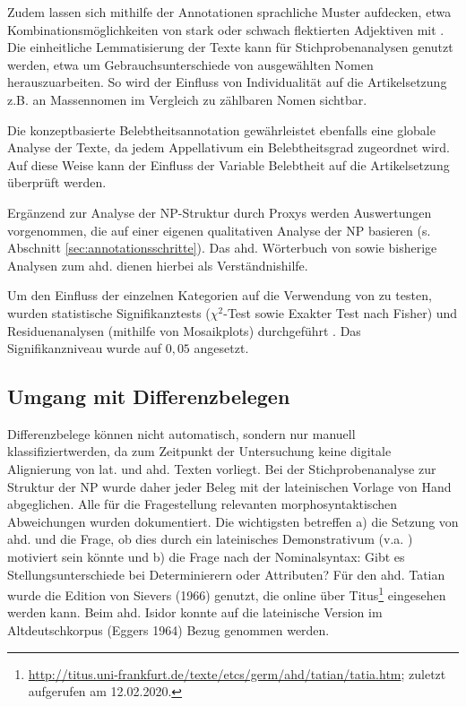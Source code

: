 Zudem lassen sich mithilfe der Annotationen sprachliche Muster aufdecken, etwa Kombinationsmöglichkeiten von stark oder schwach flektierten Adjektiven mit . Die einheitliche Lemmatisierung der Texte kann für Stichprobenanalysen genutzt werden, etwa um Gebrauchsunterschiede  von ausgewählten Nomen herauszuarbeiten. So wird der Einfluss von Individualität auf die Artikelsetzung z.B. an Massennomen im Vergleich zu zählbaren Nomen sichtbar.

Die konzeptbasierte Belebtheitsannotation gewährleistet ebenfalls eine globale Analyse der Texte, da jedem Appellativum ein Belebtheitsgrad zugeordnet wird. Auf diese Weise kann der Einfluss der Variable Belebtheit auf die Artikelsetzung überprüft werden. 

Ergänzend zur Analyse der NP-Struktur durch Proxys werden Auswertungen vorgenommen, die auf einer eigenen qualitativen Analyse der NP basieren (s. Abschnitt \ref{sec:annotationsschritte}). Das ahd. Wörterbuch von \textcite{Schutzeichel2012} sowie bisherige Analysen zum ahd.  \parencite[v.a.][]{Oubouzar1989} dienen hierbei als Verständnishilfe.  

Um den Einfluss der einzelnen Kategorien auf die Verwendung von  zu testen, wurden statistische Signifikanztests ($\chi^2$-Test sowie Exakter Test nach Fisher) und Residuenanalysen (mithilfe von Mosaikplots) durchgeführt \parencite{Gries2012}. Das Signifikanzniveau wurde auf $0,05$ angesetzt.

\subsection{Umgang mit Differenzbelegen}\label{sec:differenz}

Differenzbelege können nicht automatisch, sondern nur manuell klassifiziert\linebreak werden, da zum Zeitpunkt der Untersuchung keine digitale Alignierung von lat. und ahd. Texten vorliegt. Bei der Stichprobenanalyse zur Struktur der NP wurde daher jeder Beleg mit der lateinischen Vorlage von Hand abgeglichen. Alle für die Fragestellung relevanten morphosyntaktischen Abweichungen wurden dokumentiert. Die wichtigsten betreffen a) die Setzung von ahd.  und die Frage, ob dies durch ein lateinisches Demonstrativum (v.a. ) motiviert sein könnte und b) die Frage nach der Nominalsyntax: Gibt es Stellungsunterschiede bei Determinierern oder Attributen? Für den ahd. Tatian wurde die Edition von Sievers (1966) genutzt, die online über Titus\footnote{\url{http://titus.uni-frankfurt.de/texte/etcs/germ/ahd/tatian/tatia.htm}; zuletzt aufgerufen am 12.02.2020.} eingesehen werden kann. Beim ahd. Isidor konnte auf die lateinische Version im Altdeutschkorpus (Eggers 1964) Bezug genommen werden.  


